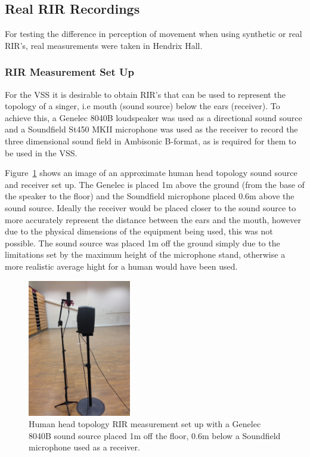 \documentclass[../../main.tex]{subfiles}
\begin{document}
\subsection{Real RIR Recordings}
\label{realRIRs}

	For testing the difference in perception of movement when using synthetic or real \ac{RIR}'s, real measurements were taken in Hendrix Hall.
	
	\subsubsection{RIR Measurement Set Up}

		For the \ac{VSS} it is desirable to obtain \ac{RIR}'s that can be used to represent the topology of a singer, i.e mouth (sound source) below the ears (receiver). To achieve this, a Genelec 8040B \cite{genelec} loudspeaker was used as a directional sound source and a Soundfield St450 MKII microphone \cite{st450} was used as the receiver to record the three dimensional sound field in Ambisonic B-format, as is required for them to be used in the \ac{VSS}. 

		Figure~\ref{realRIRTop} shows an image of an approximate human head topology sound source and receiver set up. The Genelec is placed 1m above the ground (from the base of the speaker to the floor) and the Soundfield microphone placed 0.6m above the sound source. Ideally the receiver would be placed closer to the sound source to more accurately represent the distance between the ears and the mouth, however due to the physical dimensions of the equipment being used, this was not possible. The sound source was placed 1m off the ground simply due to the limitations set by the maximum height of the microphone stand, otherwise a more realistic average hight for a human would have been used.

		\begin{figure}[p]
			\begin{center}
				\includegraphics[width=0.4\textwidth]{Sections/Implementation/RealRIRs/images/realRIRTopology1.jpg} 
				\caption{Human head topology \ac{RIR} measurement set up with a Genelec 8040B sound source placed 1m off the floor, 0.6m below a Soundfield microphone used as a receiver.}
				\label{realRIRTop}
			\end{center}
		\end{figure}
\end{document}
